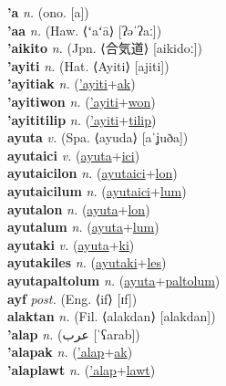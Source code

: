 \textbf{'a} \textit{n.} (ono. [a])
 \label{'a} \\
\textbf{'aa} \textit{n.} (Haw. ⟨ʻaʻā⟩ [ʔəˈʔaː])
 \label{'aa} \\
\textbf{'aikito} \textit{n.} (Jpn. ⟨合気道⟩ [aikidoː])
 \label{'aikito} \\
\textbf{'ayiti} \textit{n.} (Hat. ⟨Ayiti⟩ [ajiti])
 \label{'ayiti} \\
\textbf{'ayitiak} \textit{n.} (\hyperref['ayiti]{'ayiti}+\hyperref[ak]{ak})
 \label{'ayitiak} \\
\textbf{'ayitiwon} \textit{n.} (\hyperref['ayiti]{'ayiti}+\hyperref[won]{won})
 \label{'ayitiwon} \\
\textbf{'ayititilip} \textit{n.} (\hyperref['ayiti]{'ayiti}+\hyperref[tilip]{tilip})
 \label{'ayititilip} \\
\textbf{ayuta} \textit{v.} (Spa. ⟨ayuda⟩ [aˈʝuða])
 \label{ayuta} \\
\textbf{ayutaici} \textit{v.} (\hyperref[ayuta]{ayuta}+\hyperref[ici]{ici})
 \label{ayutaici} \\
\textbf{ayutaicilon} \textit{n.} (\hyperref[ayutaici]{ayutaici}+\hyperref[lon]{lon})
 \label{ayutaicilon} \\
\textbf{ayutaicilum} \textit{n.} (\hyperref[ayutaici]{ayutaici}+\hyperref[lum]{lum})
 \label{ayutaicilum} \\
\textbf{ayutalon} \textit{n.} (\hyperref[ayuta]{ayuta}+\hyperref[lon]{lon})
 \label{ayutalon} \\
\textbf{ayutalum} \textit{n.} (\hyperref[ayuta]{ayuta}+\hyperref[lum]{lum})
 \label{ayutalum} \\
\textbf{ayutaki} \textit{v.} (\hyperref[ayuta]{ayuta}+\hyperref[ki]{ki})
 \label{ayutaki} \\
\textbf{ayutakiles} \textit{n.} (\hyperref[ayutaki]{ayutaki}+\hyperref[les]{les})
 \label{ayutakiles} \\
\textbf{ayutapaltolum} \textit{n.} (\hyperref[ayuta]{ayuta}+\hyperref[paltolum]{paltolum})
 \label{ayutapaltolum} \\
\textbf{ayf} \textit{post.} (Eng. ⟨if⟩ [ɪf])
 \label{ayf} \\
\textbf{alaktan} \textit{n.} (Fil. ⟨alakdan⟩ [alakdan])
 \label{alaktan} \\
\textbf{'alap} \textit{n.} ({\arabics{}عرب} [ˈʕarab])
 \label{'alap} \\
\textbf{'alapak} \textit{n.} (\hyperref['alap]{'alap}+\hyperref[ak]{ak})
 \label{'alapak} \\
\textbf{'alaplawt} \textit{n.} (\hyperref['alap]{'alap}+\hyperref[lawt]{lawt})
